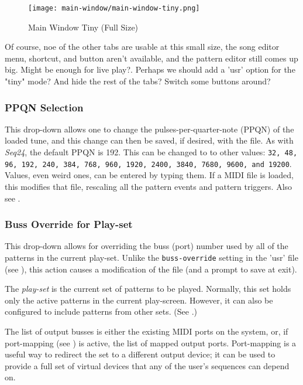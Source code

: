 \begin{figure}[H]
   \centering 
   \texttt{[image: main-window/main-window-tiny.png]}
   \caption{Main Window Tiny (Full Size)}
   \label{fig:main_window_tiny}
\end{figure}

   Of course, noe of the other tabs are usable at this small size,
   the song editor menu, shortcut, and button aren't available,
   and the pattern editor still comes up big.
   Might be enough for live play?.
   Perhaps we should add a 'usr' option for the "tiny" mode?
   And hide the rest of the tabs?
   Switch some buttons around?

\subsubsection{PPQN Selection}
\label{subsubsec:introduction_ppqn_selection}

   This drop-down allows one to change the pulses-per-quarter-note (PPQN) of the
   loaded tune, and this change can then be saved, if desired, with the file.
   As with \textsl{Seq24}, the default PPQN is 192.  This can be changed to
   to other values:
   \texttt{32, 48, 96, 192, 240, 384, 768, 960, 1920, 2400, 3840,
   7680, 9600, and 19200}.
   Values, even weird ones, can be entered by typing them.
   If a MIDI file is loaded, this modifies that file, rescaling all the
   pattern events and pattern triggers.
   Also see .

\subsubsection{Buss Override for Play-set}
\label{subsubsec:introduction_sets_buss_override}

   This drop-down allows for overriding the buss (port) number used by all of
   the patterns in the current play-set.
   Unlike the \texttt{buss-override} setting in the 'usr' file
   (see ),
   this action causes a modification of the file (and a prompt to save at
   exit).

   The \textsl{play-set} is the current set of patterns to be played.
   Normally, this set holds only the active patterns in the current
   play-screen.
   However, it can also be configured to include patterns from other sets.
   (See .)

   The list of
   output busses is either the existing MIDI ports on the system, or,
   if port-mapping (see ) is active, the list
   of mapped output ports.
   Port-mapping is a useful way to redirect the set to a different output
   device; it can be used to provide a full set of virtual devices that any of
   the user's sequences can depend on.

